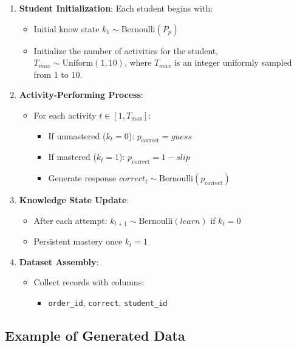 \documentclass{article}
\begin{document}
\begin{enumerate}
    \item \textbf{Student Initialization}: Each student begins with:
    \begin{itemize}
        \item Initial know state $k_1 \sim \text{Bernoulli}(P_p)$
        \item Initialize the number of activities for the student, $T_{max} \sim \text{Uniform}(1, 10)$, where $T_{max}$ is an integer uniformly sampled from 1 to 10.
    \end{itemize}
    
    \item \textbf{Activity-Performing Process}:
    \begin{itemize}
        \item For each activity $t \in [1, T_{\text{max}}]$:
        \begin{itemize}
            \item If unmastered ($k_t=0$): $p_{\text{correct}} = guess$
            \item If mastered ($k_t=1$): $p_{\text{correct}} = 1-slip$
            \item Generate response $correct_t \sim \text{Bernoulli}(p_{\text{correct}})$
        \end{itemize}
    \end{itemize}
    
    \item \textbf{Knowledge State Update}:
    \begin{itemize}
        \item After each attempt: $k_{t+1} \sim \text{Bernoulli}(learn)$ if $k_t=0$
        \item Persistent mastery once $k_t=1$
    \end{itemize}
    
    \item \textbf{Dataset Assembly}:
    \begin{itemize}
        \item Collect records with columns: 
        \begin{itemize}
            \item \texttt{order\_id}, \texttt{correct}, \texttt{student\_id}
        \end{itemize}
    \end{itemize}
\end{enumerate}

\subsection{Example of Generated Data}
\end{document}
